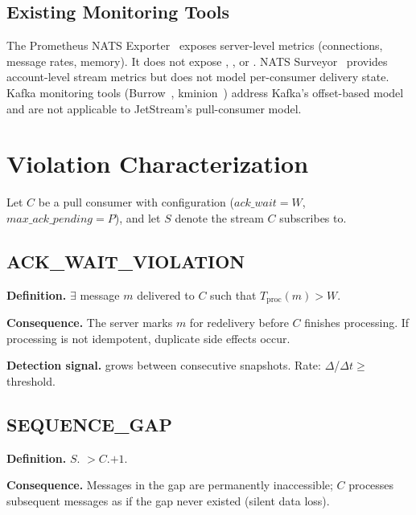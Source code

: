 \documentclass[sigconf,nonacm]{acmart}
\begin{document}
\subsection{Existing Monitoring Tools}

The Prometheus NATS Exporter~\cite{prometheus-nats} exposes server-level
metrics (connections, message rates, memory). It does not expose
, , or
. NATS Surveyor~\cite{surveyor} provides
account-level stream metrics but does not model per-consumer delivery state.
Kafka monitoring tools (Burrow~\cite{burrow}, kminion~\cite{kminion})
address Kafka's offset-based model~\cite{kafka} and are not applicable to
JetStream's pull-consumer model.

\section{Violation Characterization}

Let $C$ be a pull consumer with configuration
($\mathit{ack\_wait}{=}W$, $\mathit{max\_ack\_pending}{=}P$),
and let $S$ denote the stream $C$ subscribes to.

\subsection{ACK\_WAIT\_VIOLATION}

\textbf{Definition.} $\exists$ message $m$ delivered to $C$ such that
$T_\mathrm{proc}(m) > W$.

\textbf{Consequence.} The server marks $m$ for redelivery before $C$
finishes processing. If processing is not idempotent, duplicate side effects occur.

\textbf{Detection signal.}  grows between consecutive
snapshots. Rate: $\Delta$/$\Delta t \geq$ threshold.

\subsection{SEQUENCE\_GAP}

\textbf{Definition.} $S$. $> C$.$+1$.

\textbf{Consequence.} Messages in the gap are permanently inaccessible;
$C$ processes subsequent messages as if the gap never existed (silent data loss).
\end{document}
